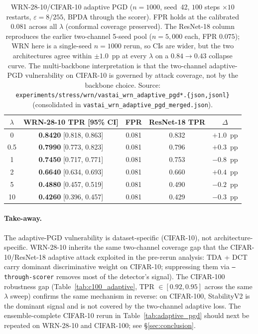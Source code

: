 \begin{table}[h]
\centering
\small
\begin{tabular}{ccccc}
\toprule
$\lambda$ & WRN-28-10 TPR [95\% CI] & FPR & ResNet-18 TPR & $\Delta$ \\
\midrule
0    & \textbf{0.8420} [0.818, 0.863] & 0.081 & 0.832 & $+1.0$~pp \\
0.5  & \textbf{0.7990} [0.773, 0.823] & 0.081 & 0.796 & $+0.3$~pp \\
1    & \textbf{0.7450} [0.717, 0.771] & 0.081 & 0.753 & $-0.8$~pp \\
2    & \textbf{0.6640} [0.634, 0.693] & 0.081 & 0.660 & $+0.4$~pp \\
5    & \textbf{0.4880} [0.457, 0.519] & 0.081 & 0.490 & $-0.2$~pp \\
10   & \textbf{0.4260} [0.396, 0.457] & 0.081 & 0.429 & $-0.3$~pp \\
\bottomrule
\end{tabular}
\caption{WRN-28-10/CIFAR-10 adaptive PGD ($n{=}1000$, seed~42,
$100$ steps $\times 10$ restarts, $\varepsilon{=}8/255$, BPDA through
the scorer). FPR holds at the calibrated $0.081$ across all
$\lambda$ (conformal coverage preserved). The ResNet-18 column
reproduces the earlier two-channel 5-seed pool
($n{=}5{,}000$ each, FPR $0.075$); WRN here is a single-seed
$n{=}1000$ rerun, so CIs are wider, but the two architectures
agree within $\pm 1.0$~pp at every $\lambda$ on a $0.84 \to 0.43$
collapse curve. The multi-backbone interpretation is that
the two-channel adaptive-PGD vulnerability on CIFAR-10 is governed by
attack coverage, not by the backbone choice. Source:
\texttt{experiments/stress/wrn/vastai\_wrn\_adaptive\_pgd*.\{json,jsonl\}}
(consolidated in \texttt{vastai\_wrn\_adaptive\_pgd\_merged.json}).}
\label{tab:wrn_adaptive}
\end{table}

\paragraph{Take-away.}
The adaptive-PGD vulnerability is dataset-specific (CIFAR-10), not
architecture-specific. WRN-28-10 inherits the same
two-channel coverage gap that the CIFAR-10/ResNet-18 adaptive
attack exploited in the pre-rerun analysis: TDA + DCT carry dominant
discriminative weight on CIFAR-10; suppressing them via
\texttt{--through-scorer} removes most of the detector's signal).
The CIFAR-100 robustness gap (Table~\ref{tab:c100_adaptive},
TPR $\in [0.92, 0.95]$ across the same $\lambda$ sweep) confirms the
same mechanism in reverse: on CIFAR-100, StabilityV2 is the
dominant signal and is not covered by the two-channel adaptive loss.
The ensemble-complete CIFAR-10 rerun in Table~\ref{tab:adaptive_pgd}
should next be repeated on WRN-28-10 and CIFAR-100; see
\S\ref{sec:conclusion}.

